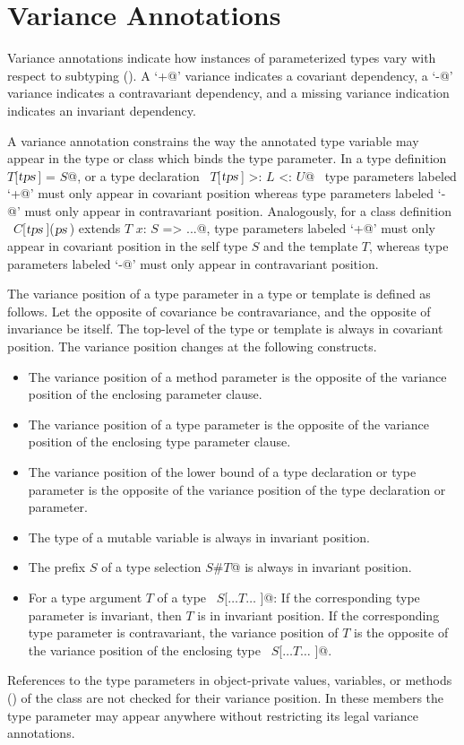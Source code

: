 \section{Variance Annotations}\label{sec:variances}

Variance annotations indicate how instances of parameterized types
vary with respect to subtyping ().  A
`\lstinline@+@' variance indicates a covariant dependency, a
`\lstinline@-@' variance indicates a contravariant dependency, and a
missing variance indication indicates an invariant dependency.

A variance annotation constrains the way the annotated type variable
may appear in the type or class which binds the type parameter.  In a
type definition ~\lstinline@type $T$[$\mbox{\sl tps}\,$] = $S$@, or a type 
declaration ~\lstinline@type $T$[$\mbox{\sl tps}\,$] >: $L$ <: $U$@~ type parameters labeled
`\lstinline@+@' must only appear in covariant position whereas
type parameters labeled `\lstinline@-@' must only appear in contravariant
position. Analogously, for a class definition
~\lstinline@class $C$[$\mbox{\sl tps}\,$]($\mbox{\sl ps}\,$) extends $T$ { $x$: $S$ => ...}@, 
type parameters labeled
`\lstinline@+@' must only appear in covariant position in the
self type $S$ and the template $T$, whereas type
parameters labeled `\lstinline@-@' must only appear in contravariant
position. 

The variance position of a type parameter in a type or template is
defined as follows.  Let the opposite of covariance be contravariance,
and the opposite of invariance be itself.  The top-level of the type
or template is always in covariant position. The variance position
changes at the following constructs.
\begin{itemize}
\item
The variance position of a method parameter is the opposite of the 
variance position of the enclosing parameter clause.
\item
The variance position of a type parameter is the opposite of the
variance position of the enclosing type parameter clause.
\item
The variance position of the lower bound of a type declaration or type parameter 
is the opposite of the variance position of the type declaration or parameter.  
\item
The type of a mutable variable is always in invariant position.
\item 
The prefix $S$ of a type selection \lstinline@$S$#$T$@ is always in invariant position.
\item
For a type argument $T$ of a type ~\lstinline@$S$[$\ldots T \ldots$ ]@: If the
corresponding type parameter is invariant, then $T$ is in
invariant position.  If the corresponding type parameter is
contravariant, the variance position of $T$ is the opposite of
the variance position of the enclosing type ~\lstinline@$S$[$\ldots T \ldots$ ]@.
\end{itemize}
References to the type parameters in object-private values, variables,
or methods () of the class are not checked for their variance
position. In these members the type parameter may appear anywhere
without restricting its legal variance annotations.

